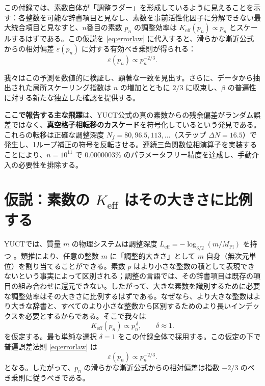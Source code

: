 \documentclass[11pt,a4paper]{article}
\begin{document}
	この付録では、素数自体が「調整ラダー」を形成しているように見えることを示す：各整数を可能な辞書項目と見なし、素数を事前活性化因子に分解できない最大統合項目と見なすと、\(n\)番目の素数 \(p_n\) の調整効率は \(K_{\mathrm{eff}}(p_n) \propto p_n\) とスケールするはずである。この仮説を \eqref{eq:errorlaw} に代入すると、滑らかな漸近公式からの相対偏差 \(\varepsilon(p_n)\) に対する有効べき乗則が得られる：
	\[
	\varepsilon(p_n) \propto p_n^{-2/3}.
	\]
	
	我々はこの予測を数値的に検証し、顕著な一致を見出す。さらに、データから抽出された局所スケーリング指数は \(n\) の増加とともに \(2/3\) に収束し、\(\beta\) の普遍性に対する新たな独立した確認を提供する。
	
	\textbf{ここで報告する主な飛躍}は、YUCT公式の真の素数からの残余偏差がランダム誤差ではなく、\textbf{真空格子相転移のカスケード}を符号化しているという発見である。これらの転移は正確な調整深度 \(N_f = 80, 96.5, 113, \dots\)（ステップ \(\Delta N = 16.5\)）で発生し、1ループ補正の符号を反転させる。連続三角関数位相演算子を実装することにより、\(n=10^{11}\) で \(0.0000003\%\) のパラメータフリー精度を達成し、手動介入の必要性を排除する。
	
	\section{仮説：素数の \(K_{\mathrm{eff}}\) はその大きさに比例する}
	YUCTでは、質量 \(m\) の物理システムは調整深度 \(L_{\mathrm{eff}} = -\log_{3/2}(m/M_{\mathrm{Pl}})\) を持つ \cite{YakushevLaw2026}。類推により、任意の整数 \(m\) に「調整的大きさ」として \(m\) 自身（無次元単位）を割り当てることができる。素数 \(p\) はより小さな整数の積として表現できないという事実によって区別される；調整の言語では、その辞書項目は既存の項目の組み合わせに還元できない。したがって、大きな素数を識別するために必要な調整効率はその大きさに比例するはずである。なぜなら、より大きな整数はより大きな辞書と、すべてのより小さな整数から区別するためのより長いインデックスを必要とするからである。そこで我々は
	\begin{equation}\label{eq:Keff-prime}
		K_{\mathrm{eff}}(p_n) \propto p_n^{\,\delta}, \qquad \delta \approx 1.
	\end{equation}
	を仮定する。最も単純な選択 \(\delta = 1\) をこの付録全体で採用する。この仮定の下で普遍誤差法則 \eqref{eq:errorlaw} は
	\begin{equation}\label{eq:error-prime}
		\varepsilon(p_n) \propto p_n^{-2/3}.
	\end{equation}
	となる。したがって、\(p_n\) の滑らかな漸近公式からの相対偏差は指数 \(-2/3\) のべき乗則に従うべきである。
	
\end{document}
